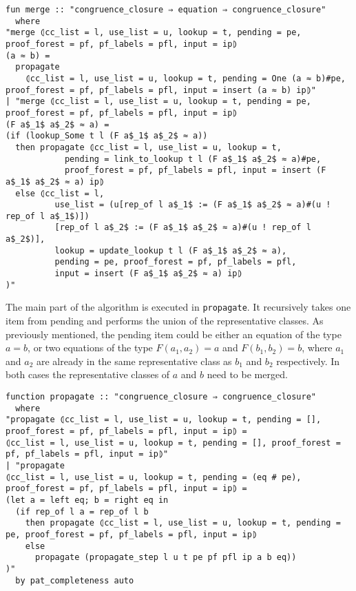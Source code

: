 \begin{lstlisting}
fun merge :: "congruence_closure ⇒ equation ⇒ congruence_closure"
  where
"merge ⦇cc_list = l, use_list = u, lookup = t, pending = pe, proof_forest = pf, pf_labels = pfl, input = ip⦈
(a ≈ b) =
  propagate
    ⦇cc_list = l, use_list = u, lookup = t, pending = One (a ≈ b)#pe, proof_forest = pf, pf_labels = pfl, input = insert (a ≈ b) ip⦈"
| "merge ⦇cc_list = l, use_list = u, lookup = t, pending = pe, proof_forest = pf, pf_labels = pfl, input = ip⦈
(F a$_1$ a$_2$ ≈ a) =
(if (lookup_Some t l (F a$_1$ a$_2$ ≈ a))
  then propagate ⦇cc_list = l, use_list = u, lookup = t,
            pending = link_to_lookup t l (F a$_1$ a$_2$ ≈ a)#pe,
            proof_forest = pf, pf_labels = pfl, input = insert (F a$_1$ a$_2$ ≈ a) ip⦈
  else ⦇cc_list = l,
          use_list = (u[rep_of l a$_1$ := (F a$_1$ a$_2$ ≈ a)#(u ! rep_of l a$_1$)])
          [rep_of l a$_2$ := (F a$_1$ a$_2$ ≈ a)#(u ! rep_of l a$_2$)],
          lookup = update_lookup t l (F a$_1$ a$_2$ ≈ a),
          pending = pe, proof_forest = pf, pf_labels = pfl,
          input = insert (F a$_1$ a$_2$ ≈ a) ip⦈
)"
\end{lstlisting}

The main part of the algorithm is executed in \lstinline{propagate}. It recursively takes one item from pending and performs the union of the representative classes. As previously mentioned, the pending item could be either an equation of the type $a = b$, or two equations of the type $F(a_1, a_2) = a$ and $F(b_1, b_2) = b$, where $a_1$ and $a_2$ are already in the same representative class as $b_1$ and $b_2$ respectively. In both cases the representative classes of $a$ and $b$ need to be merged.

\begin{lstlisting}
function propagate :: "congruence_closure ⇒ congruence_closure"
  where
"propagate ⦇cc_list = l, use_list = u, lookup = t, pending = [], proof_forest = pf, pf_labels = pfl, input = ip⦈ =
⦇cc_list = l, use_list = u, lookup = t, pending = [], proof_forest = pf, pf_labels = pfl, input = ip⦈"
| "propagate
⦇cc_list = l, use_list = u, lookup = t, pending = (eq # pe), proof_forest = pf, pf_labels = pfl, input = ip⦈ =
(let a = left eq; b = right eq in
  (if rep_of l a = rep_of l b
    then propagate ⦇cc_list = l, use_list = u, lookup = t, pending = pe, proof_forest = pf, pf_labels = pfl, input = ip⦈
    else
      propagate (propagate_step l u t pe pf pfl ip a b eq))
)"
  by pat_completeness auto
\end{lstlisting}

